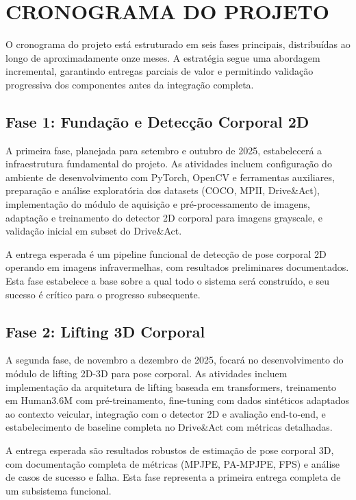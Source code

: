 \documentclass[12pt, a4paper]{article}
\begin{document}
\section{CRONOGRAMA DO PROJETO}

O cronograma do projeto está estruturado em seis fases principais, distribuídas ao longo de aproximadamente onze meses. A estratégia segue uma abordagem incremental, garantindo entregas parciais de valor e permitindo validação progressiva dos componentes antes da integração completa.

\subsection{Fase 1: Fundação e Detecção Corporal 2D}

A primeira fase, planejada para setembro e outubro de 2025, estabelecerá a infraestrutura fundamental do projeto. As atividades incluem configuração do ambiente de desenvolvimento com PyTorch, OpenCV e ferramentas auxiliares, preparação e análise exploratória dos datasets (COCO, MPII, Drive\&Act), implementação do módulo de aquisição e pré-processamento de imagens, adaptação e treinamento do detector 2D corporal para imagens grayscale, e validação inicial em subset do Drive\&Act.

A entrega esperada é um pipeline funcional de detecção de pose corporal 2D operando em imagens infravermelhas, com resultados preliminares documentados. Esta fase estabelece a base sobre a qual todo o sistema será construído, e seu sucesso é crítico para o progresso subsequente.

\subsection{Fase 2: Lifting 3D Corporal}

A segunda fase, de novembro a dezembro de 2025, focará no desenvolvimento do módulo de lifting 2D-3D para pose corporal. As atividades incluem implementação da arquitetura de lifting baseada em transformers, treinamento em Human3.6M com pré-treinamento, fine-tuning com dados sintéticos adaptados ao contexto veicular, integração com o detector 2D e avaliação end-to-end, e estabelecimento de baseline completa no Drive\&Act com métricas detalhadas.

A entrega esperada são resultados robustos de estimação de pose corporal 3D, com documentação completa de métricas (MPJPE, PA-MPJPE, FPS) e análise de casos de sucesso e falha. Esta fase representa a primeira entrega completa de um subsistema funcional.
\end{document}
